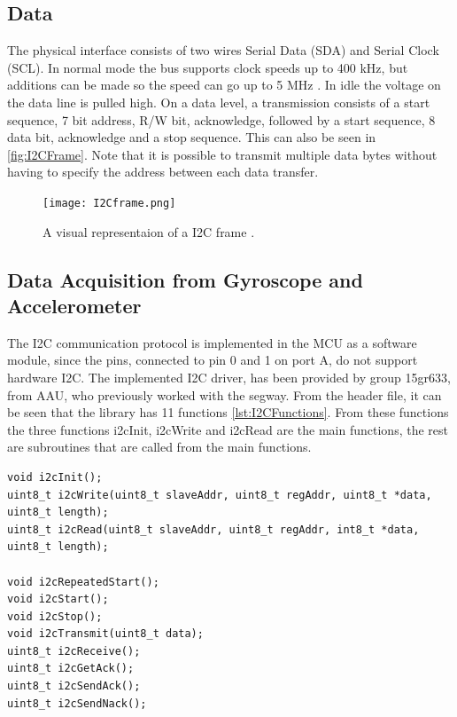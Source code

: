 \subsection{\iic Data}
The physical interface consists of two wires Serial Data (SDA) and Serial Clock (SCL). In normal mode the bus supports clock speeds up to 400 kHz, but additions can be made so the speed can go up to 5 MHz \citep{I2C}. In idle the voltage on the data line is pulled high. On a data level, a transmission consists of a start sequence, 7 bit address, R/W bit, acknowledge, followed by a start sequence, 8 data bit, acknowledge and a stop sequence. This can also be seen in \autoref{fig:I2CFrame}. Note that it is possible to transmit multiple data bytes without having to specify the address between each data transfer.

\begin{figure}[H]
\centering
\texttt{[image: I2Cframe.png]}
\caption{A visual representaion of a \gls{I2C} frame \citep{sou:i2c}.}
\label{fig:I2CFrame}
\end{figure}

\subsection{Data Acquisition from Gyroscope and Accelerometer}
The \gls{I2C} communication protocol is implemented in the MCU as a software module, since the pins, connected to pin 0 and 1 on port A, do not support hardware \gls{I2C}. The implemented \gls{I2C} driver, has been provided by group 15gr633, from AAU, who previously worked with the segway. From the header file, it can be seen that the library has 11 functions \autoref{lst:I2CFunctions}. From these functions the three functions i2cInit, i2cWrite and i2cRead are the main functions, the rest are subroutines that are called from the main functions.

\begin{lstlisting}
void i2cInit();
uint8_t i2cWrite(uint8_t slaveAddr, uint8_t regAddr, uint8_t *data, uint8_t length);
uint8_t i2cRead(uint8_t slaveAddr, uint8_t regAddr, int8_t *data, uint8_t length);

void i2cRepeatedStart(); 
void i2cStart();
void i2cStop();
void i2cTransmit(uint8_t data);
uint8_t i2cReceive();
uint8_t i2cGetAck();
uint8_t i2cSendAck();
uint8_t i2cSendNack();
\end{lstlisting}

